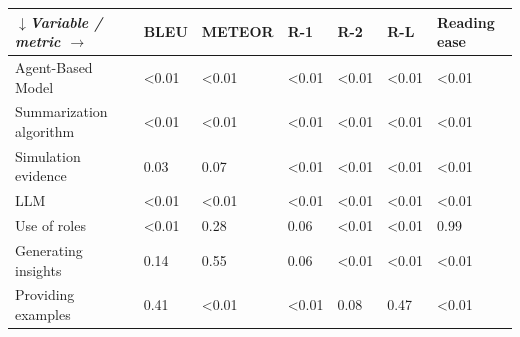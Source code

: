 \begin{tabular}{|l|l|l|l|l|l|l|}
\hline
\textit{$\downarrow$Variable / metric $\rightarrow$} & BLEU & METEOR & R-1 & R-2 & R-L & Reading ease \\
 \hline
 Agent-Based Model & \textless{}0.01 & \textless{}0.01 & \textless{}0.01 & \textless{}0.01 & \textless{}0.01 & \textless{}0.01 \\
 \hline
 Summarization algorithm & \textless{}0.01 & \textless{}0.01 & \textless{}0.01 & \textless{}0.01 & \textless{}0.01 & \textless{}0.01 \\
 \hline
 Simulation evidence & 0.03 & 0.07 & \textless{}0.01 & \textless{}0.01 & \textless{}0.01 & \textless{}0.01 \\
 \hline
 LLM & \textless{}0.01 & \textless{}0.01 & \textless{}0.01 & \textless{}0.01 & \textless{}0.01 & \textless{}0.01 \\
 \hline
 Use of roles & \textless{}0.01 & 0.28 & 0.06 & \textless{}0.01 & \textless{}0.01 & 0.99 \\
 \hline
 Generating insights & 0.14 & 0.55 & 0.06 & \textless{}0.01 & \textless{}0.01 & \textless{}0.01 \\
 \hline
 Providing examples & 0.41 & \textless{}0.01 & \textless{}0.01 & 0.08 & 0.47 & \textless{}0.01 \\
\hline
\end{tabular}
